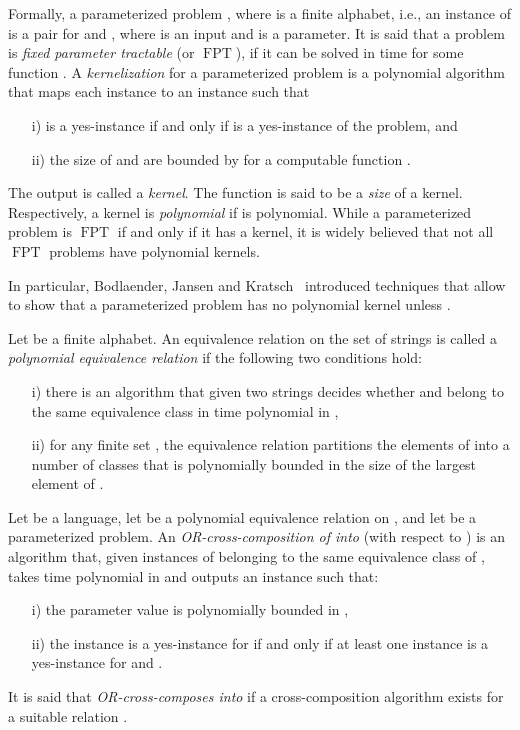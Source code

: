 \documentclass[11pt]{article}
\DeclareMathOperator{\operatorClassFPT}{FPT}
\newcommand{\classFPT}{\ensuremath{\operatorClassFPT}}
\begin{document}
Formally, a parameterized problem , where  is a finite alphabet, i.e., an instance of  is a pair  for  and , where  is an input and  is a parameter.
It is said that a problem is \emph{fixed parameter tractable} (or \classFPT), if it can be solved in time  for some function . 
A \emph{kernelization} for a parameterized problem is a polynomial algorithm that maps each instance   to an instance  such that 
\begin{itemize}
\item[i)]  is a yes-instance if and only if  is a yes-instance of the problem, and
\item[ii)] the size of  and  are bounded by  for a computable function . 
\end{itemize}
The output  is called a \emph{kernel}. The function  is said to be a \emph{size} of a kernel. Respectively, a kernel is \emph{polynomial} if  is polynomial. 
While a parameterized problem is \classFPT{} if and only if it has a kernel, it is widely believed that not all \classFPT{} problems have polynomial kernels.

 In particular, Bodlaender, Jansen and Kratsch~\cite{BodlaenderJK14} introduced techniques that allow to show that a parameterized problem has no polynomial kernel unless  .


Let  be a finite alphabet. An equivalence relation  on the set of strings  is called a \emph{polynomial equivalence relation} if the following two conditions hold:
\begin{itemize}
\item[i)] there is an algorithm that given two strings  decides whether  and  belong to
the same equivalence class in time polynomial in ,
\item[ii)] for any finite set , the equivalence relation  partitions the elements of  into a
number of classes that is polynomially bounded in the size of the largest element of .
\end{itemize}


Let  be a language, let  be a polynomial
equivalence relation on , and let    
be a parameterized problem.  An \emph{OR-cross-composition of  into } (with respect to ) is an algorithm that, given  instances  
of  belonging to the same equivalence class of , takes time polynomial in
 and outputs an instance  such that:
\begin{itemize}
\item[i)] the parameter value  is polynomially bounded in ,
\item[ii)] the instance  is a yes-instance for  if and only if at least one instance  is a yes-instance for  and .
\end{itemize}
It is said that  \emph{OR-cross-composes into}  if a cross-composition
algorithm exists for a suitable relation .
\end{document}
